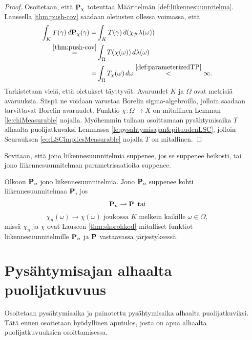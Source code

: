 \documentclass[12pt,oneside,a4paper]{amsbook} %
\begin{document}
\begin{proof}
Osoitetaan, että $\P_\chi$ toteuttaa Määritelmän \ref{def:liikennesuunnitelma}. Lauseella \ref{thm:push-cov} saadaan oletusten ollessa voimassa, että
\begin{align*}
    \int_K T(\gamma)\, d\P_\chi(\gamma) =& \int_K T(\gamma) \, d(\chi_\# \lambda(\omega)) \\
    \stackrel{\ref{thm:push-cov}}{=}& \int_\Omega T(\chi(\omega)) \, d\lambda(\omega) \\
    =& \int_\Omega T_\chi(\omega) \, d\omega \stackrel{\ref{def:parameterizedTP}}{<} \infty.
\end{align*}
Tarkistetaan vielä, että oletukset täyttyvät. Avaruudet $K$ ja $\Omega$ ovat metrisiä avaruuksia. Siispä ne voidaan varustaa Borelin sigma-algebroilla, jolloin saadaan tarvittavat Borelin avaruudet. Funktio $\chi:\Omega \to X$ on mitallinen Lemman \ref{le:chiMeasurable} nojalla. Myöhemmin tullaan osoittamaan pysähtymisaika $T$ alhaalta puolijatkuvaksi Lemmassa \ref{le:pysahtymisajan&pituudenLSC}, jolloin Seurauksen \ref{co:LSCimpliesMeasurable} nojalla $T$ on mitallinen. 
\end{proof}

Sovitaan, että jono liikennesuunnitelmia suppenee, jos se suppenee heikosti, tai jono liikennesuunnitelman parametrisaatioita suppenee.

\begin{definition}
    Olkoon $\P_n$ jono liikennesuunnitelmia. Jono $\P_n$ suppenee kohti liikennesuunnitelmaa $\P$, jos 
    $$\P_n \rightharpoonup \P \, \text{ tai}$$
    $$ \chi_n (\omega) \to  \chi (\omega) \text{ joukossa } K \text{ melkein kaikille } \omega
    \in \Omega,$$
    missä $ \chi_n$ ja $ \chi$ ovat Lauseen \ref{thm:skorohkod} mitalliset funktiot liikennesuunnitelmille $\P_n$ ja $\P$ vastaavassa järjestyksessä.
\end{definition}

\section{Pysähtymisajan alhaalta puolijatkuvuus}

Osoitetaan pysähtymisaika ja painotettu pysähtymisaika alhaalta puolijatkuviksi. Tätä ennen osoitetaan hyödyllinen aputulos, josta on apua alhaalta puolijatkuvuuksien osoittamisessa.
\end{document}
